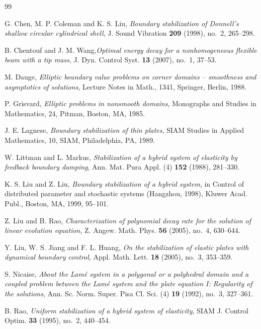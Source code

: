 \documentclass[twoside]{article}
\theoremstyle{noparens}
\theoremstyle{definition}
\numberwithin{equation}{section}
\numberwithin{figure}{section}
\begin{document}
\begin{thebibliography}{99}
{ G. Chen, M. P. Coleman and K. S. Liu, {\it  Boundary stabilization of Donnell's shallow circular cylindrical shell}, J. Sound Vibration {\bf 209} (1998), no.~2, 265--298.

 B. Chentouf and J. M. Wang,{\it  Optimal energy decay for a nonhomogeneous flexible beam with a tip mass}, J. Dyn. Control Syst. {\bf 13} (2007), no.~1, 37--53.

 M. Dauge, {\it Elliptic boundary value problems on corner domains -- smoothness and asymptotics of solutions}, Lecture Notes in Math., 1341, Springer, Berlin, 1988.

 P. Grisvard, {\it Elliptic problems in nonsmooth domains}, Monographs and Studies in Mathematics, 24, Pitman, Boston, MA, 1985.


 J. E. Lagnese, {\it Boundary stabilization of thin plates}, SIAM Studies in Applied Mathematics, 10, SIAM, Philadelphia, PA, 1989.



 W. Littman and L. Markus, {\it Stabilization of a hybrid system of elasticity by feedback boundary damping}, Ann. Mat. Pura Appl. (4) {\bf 152} (1988), 281--330.

 K. S. Liu and Z. Liu, {\it Boundary stabilization of a hybrid system}, in   Control of distributed parameter and stochastic systems (Hangzhou, 1998), Kluwer Acad. Publ., Boston, MA, 1999, 95--101.

 Z. Liu and B. Rao, {\it  Characterization of polynomial decay rate for the solution of linear evolution equation}, Z. Angew. Math. Phys. {\bf 56} (2005), no.~4, 630--644.

 Y. Liu, W. S. Jiang and F. L. Huang, {\it On the stabilization of elastic plates with dynamical boundary control}, Appl. Math. Lett. {\bf 18} (2005), no.~3, 353--359.

 S. Nicaise, {\it About the Lam\'e system in a polygonal or a polyhedral domain and a coupled problem between the Lam\'e system and the plate equation I: Regularity of the solutions}, Ann. Sc. Norm. Super. Pisa Cl. Sci. (4) {\bf 19} (1992), no.~3, 327--361.

 B. Rao, {\it Uniform stabilization of a hybrid system of elasticity}, SIAM J. Control Optim. {\bf 33} (1995), no.~2, 440--454.

}
\end{thebibliography}
\end{document}
